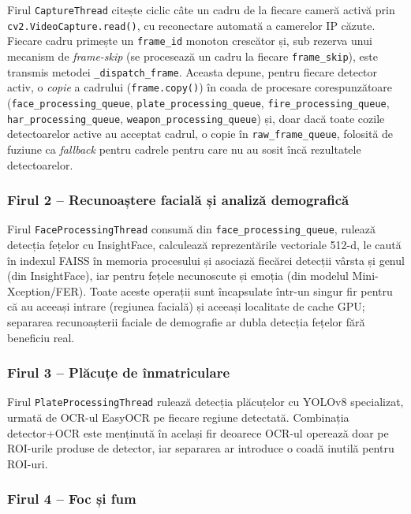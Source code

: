 \documentclass[../../main.tex]{subfiles}
\begin{document}
Firul \texttt{CaptureThread} citește ciclic câte un cadru de la fiecare cameră activă prin \texttt{cv2.VideoCapture.read()}, cu reconectare automată a camerelor IP căzute. Fiecare cadru primește un \texttt{frame\_id} monoton crescător și, sub rezerva unui mecanism de \emph{frame-skip} (se procesează un cadru la fiecare \texttt{frame\_skip}), este transmis metodei \texttt{\_dispatch\_frame}. Aceasta depune, pentru fiecare detector activ, o \emph{copie} a cadrului (\texttt{frame.copy()}) în coada de procesare corespunzătoare (\texttt{face\_processing\_queue}, \texttt{plate\_processing\_queue}, \texttt{fire\_processing\_\linebreak queue}, \texttt{har\_processing\_queue}, \texttt{weapon\_processing\_queue}) și, doar dacă toate cozile detectoarelor active au acceptat cadrul, o copie în \texttt{raw\_frame\_queue}, folosită de fuziune ca \emph{fallback} pentru cadrele pentru care nu au sosit încă rezultatele detectoarelor.

\subsubsection{Firul 2 -- Recunoaștere facială și analiză demografică}

Firul \texttt{FaceProcessingThread} consumă din \texttt{face\_processing\_queue}, rulează detecția fețelor cu InsightFace, calculează reprezentările vectoriale 512-d, le caută în indexul FAISS în memoria procesului și asociază fiecărei detecții vârsta și genul (din InsightFace), iar pentru fețele necunoscute și emoția (din modelul Mini-Xception/FER). Toate aceste operații sunt încapsulate într-un singur fir pentru că au aceeași intrare (regiunea facială) și aceeași localitate de cache GPU; separarea recunoașterii faciale de demografie ar dubla detecția fețelor fără beneficiu real.

\subsubsection{Firul 3 -- Plăcuțe de înmatriculare}

Firul \texttt{PlateProcessingThread} rulează detecția plăcuțelor cu YOLOv8 specializat, urmată de OCR-ul EasyOCR pe fiecare regiune detectată. Combinația detector+OCR este menținută în același fir deoarece OCR-ul operează doar pe ROI-urile produse de detector, iar separarea ar introduce o coadă inutilă pentru ROI-uri.

\subsubsection{Firul 4 -- Foc și fum}
\end{document}
